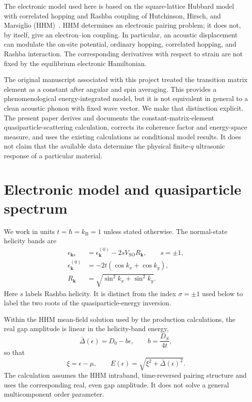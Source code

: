 \documentclass[aps,prb,preprint,superscriptaddress]{revtex4-2}
\newcommand{\kb}{k_{\mathrm B}}
\newcommand{\Dbar}{\bar\Delta}
\begin{document}
The electronic model used here is based on the square-lattice Hubbard model with correlated hopping and Rashba coupling of Hutchinson, Hirsch, and Marsiglio (HHM)~\cite{HHM}. HHM determines an electronic pairing problem; it does not, by itself, give an electron--ion coupling. In particular, an acoustic displacement can modulate the on-site potential, ordinary hopping, correlated hopping, and Rashba interaction. The corresponding derivatives with respect to strain are not fixed by the equilibrium electronic Hamiltonian.

The original manuscript associated with this project treated the transition matrix element as a constant after angular and spin averaging. This provides a phenomenological energy-integrated model, but it is not equivalent in general to a clean acoustic phonon with fixed wave vector. We make that distinction explicit. The present paper derives and documents the constant-matrix-element quasiparticle-scattering calculation, corrects its coherence factor and energy-space measure, and uses the existing calculations as conditional model results. It does not claim that the available data determine the physical finite-$q$ ultrasonic response of a particular material.

\section{Electronic model and quasiparticle spectrum}

We work in units $t=\hbar=\kb=1$ unless stated otherwise. The normal-state helicity bands are
\begin{align}
 \epsilon_{\bm k s} &= \epsilon_{\bm k}^{(0)}-2sV_{\mathrm{SO}}R_{\bm k},\qquad s=\pm1,\\
 \epsilon_{\bm k}^{(0)}&=-2t(\cos k_x+\cos k_y),\\
 R_{\bm k}&=\sqrt{\sin^2 k_x+\sin^2 k_y}.
\end{align}
Here $s$ labels Rashba helicity. It is distinct from the index $\sigma=\pm1$ used below to label the two roots of the quasiparticle-energy inversion.

Within the HHM mean-field solution used by the production calculations, the real gap amplitude is linear in the helicity-band energy,
\begin{equation}
 \Dbar(\epsilon)=D_0-b\epsilon,\qquad b=\frac{D_S}{4t},
\end{equation}
so that
\begin{equation}
 \xi=\epsilon-\mu,\qquad E(\epsilon)=\sqrt{\xi^2+\Dbar(\epsilon)^2}.
 \label{eq:qpenergy}
\end{equation}
The calculation assumes the HHM intraband, time-reversed pairing structure and uses the corresponding real, even gap amplitude. It does not solve a general multicomponent order parameter.
\end{document}
